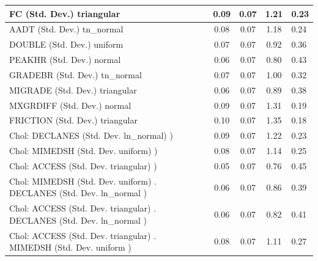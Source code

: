 \begin{table}
\begin{center}
\begin{tabular}{|l|l|c|c|c|l|}
			\hline
			FC (Std. Dev.) triangular &  & 0.09 & 0.07 & 1.21 & 0.23 \\
			\hline
			AADT (Std. Dev.) tn_normal &  & 0.08 & 0.07 & 1.18 & 0.24 \\
			\hline
			DOUBLE (Std. Dev.) uniform &  & 0.07 & 0.07 & 0.92 & 0.36 \\
			\hline
			PEAKHR (Std. Dev.) normal &  & 0.06 & 0.07 & 0.80 & 0.43 \\
			\hline
			GRADEBR (Std. Dev.) tn_normal &  & 0.07 & 0.07 & 1.00 & 0.32 \\
			\hline
			MIGRADE (Std. Dev.) triangular &  & 0.06 & 0.07 & 0.89 & 0.38 \\
			\hline
			MXGRDIFF (Std. Dev.) normal &  & 0.09 & 0.07 & 1.31 & 0.19 \\
			\hline
			FRICTION (Std. Dev.) triangular &  & 0.10 & 0.07 & 1.35 & 0.18 \\
			\hline
			 Chol: DECLANES (Std. Dev. ln_normal) ) &  & 0.09 & 0.07 & 1.22 & 0.23 \\
			\hline
			 Chol: MIMEDSH (Std. Dev. uniform) ) &  & 0.08 & 0.07 & 1.14 & 0.25 \\
			\hline
			 Chol: ACCESS (Std. Dev. triangular) ) &  & 0.05 & 0.07 & 0.76 & 0.45 \\
			\hline
			 Chol: MIMEDSH (Std. Dev. uniform) . DECLANES (Std. Dev.   ln_normal ) &  & 0.06 & 0.07 & 0.86 & 0.39 \\
			\hline
			 Chol: ACCESS (Std. Dev. triangular) . DECLANES (Std. Dev.   ln_normal ) &  & 0.06 & 0.07 & 0.82 & 0.41 \\
			\hline
			 Chol: ACCESS (Std. Dev. triangular) . MIMEDSH (Std. Dev.   uniform ) &  & 0.08 & 0.07 & 1.11 & 0.27 \\
			\hline
		\end{tabular}
	\end{center}
\end{table}